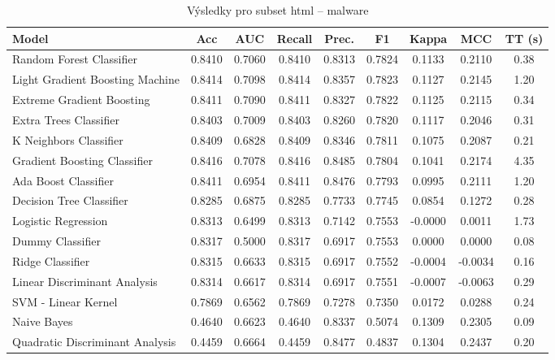 \begin{table}[H]
  \centering
  \small
  \caption{Výsledky pro subset html – malware}
  \begin{tabular}{|l|c|c|c|c|c|c|c|c|}
    \hline
    \textbf{Model} & \textbf{Acc} & \textbf{AUC} & \textbf{Recall} & \textbf{Prec.} & \textbf{F1} & \textbf{Kappa} & \textbf{MCC} & \textbf{TT (s)} \\
    \hline
    Random Forest Classifier & 0.8410 & 0.7060 & 0.8410 & 0.8313 & 0.7824 & 0.1133 & 0.2110 & 0.38 \\
    Light Gradient Boosting Machine & 0.8414 & 0.7098 & 0.8414 & 0.8357 & 0.7823 & 0.1127 & 0.2145 & 1.20 \\
    Extreme Gradient Boosting & 0.8411 & 0.7090 & 0.8411 & 0.8327 & 0.7822 & 0.1125 & 0.2115 & 0.34 \\
    Extra Trees Classifier & 0.8403 & 0.7009 & 0.8403 & 0.8260 & 0.7820 & 0.1117 & 0.2046 & 0.31 \\
    K Neighbors Classifier & 0.8409 & 0.6828 & 0.8409 & 0.8346 & 0.7811 & 0.1075 & 0.2087 & 0.21 \\
    Gradient Boosting Classifier & 0.8416 & 0.7078 & 0.8416 & 0.8485 & 0.7804 & 0.1041 & 0.2174 & 4.35 \\
    Ada Boost Classifier & 0.8411 & 0.6954 & 0.8411 & 0.8476 & 0.7793 & 0.0995 & 0.2111 & 1.20 \\
    Decision Tree Classifier & 0.8285 & 0.6875 & 0.8285 & 0.7733 & 0.7745 & 0.0854 & 0.1272 & 0.28 \\
    Logistic Regression & 0.8313 & 0.6499 & 0.8313 & 0.7142 & 0.7553 & -0.0000 & 0.0011 & 1.73 \\
    Dummy Classifier & 0.8317 & 0.5000 & 0.8317 & 0.6917 & 0.7553 & 0.0000 & 0.0000 & 0.08 \\
    Ridge Classifier & 0.8315 & 0.6633 & 0.8315 & 0.6917 & 0.7552 & -0.0004 & -0.0034 & 0.16 \\
    Linear Discriminant Analysis & 0.8314 & 0.6617 & 0.8314 & 0.6917 & 0.7551 & -0.0007 & -0.0063 & 0.29 \\
    SVM - Linear Kernel & 0.7869 & 0.6562 & 0.7869 & 0.7278 & 0.7350 & 0.0172 & 0.0288 & 0.24 \\
    Naive Bayes & 0.4640 & 0.6623 & 0.4640 & 0.8337 & 0.5074 & 0.1309 & 0.2305 & 0.09 \\
    Quadratic Discriminant Analysis & 0.4459 & 0.6664 & 0.4459 & 0.8477 & 0.4837 & 0.1304 & 0.2437 & 0.20 \\
    \hline
  \end{tabular}
\end{table}
\vspace{0.5cm}

